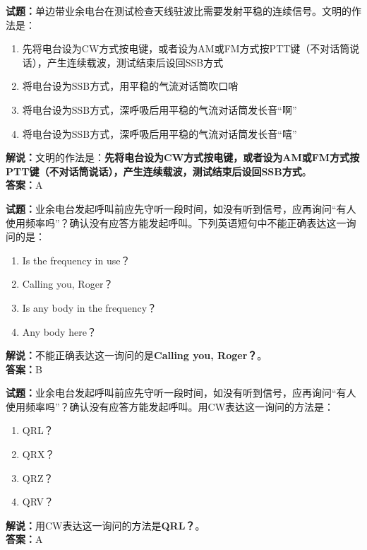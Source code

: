 \documentclass{ctexbook}
\begin{document}
\bigskip


\noindent\textbf{试题：}单边带业余电台在测试检查天线驻波比需要发射平稳的连续信号。文明的作法是：
\begin{enumerate}[leftmargin=3em]
\item 先将电台设为CW方式按电键，或者设为AM或FM方式按PTT键（不对话筒说话），产生连续载波，测试结束后设回SSB方式
\item 将电台设为SSB方式，用平稳的气流对话筒吹口哨
\item 将电台设为SSB方式，深呼吸后用平稳的气流对话筒发长音“啊”
\item 将电台设为SSB方式，深呼吸后用平稳的气流对话筒发长音“嘻”
\end{enumerate}
\noindent\textbf{解说：}文明的作法是：\textbf{先将电台设为CW方式按电键，或者设为AM或FM方式按PTT键（不对话筒说话），产生连续载波，测试结束后设回SSB方式}。\\\noindent\textbf{答案：}A



\bigskip


\noindent\textbf{试题：}业余电台发起呼叫前应先守听一段时间，如没有听到信号，应再询问“有人使用频率吗”？确认没有应答方能发起呼叫。下列英语短句中不能正确表达这一询问的是：
\begin{enumerate}[leftmargin=3em]
\item Is the frequency in use？
\item Calling you, Roger？%
\item Is any body in the frequency？
\item Any body here？
\end{enumerate}
\noindent\textbf{解说：}不能正确表达这一询问的是\textbf{Calling you, Roger？}。\\\noindent\textbf{答案：}B



\bigskip


\noindent\textbf{试题：}业余电台发起呼叫前应先守听一段时间，如没有听到信号，应再询问“有人使用频率吗”？确认没有应答方能发起呼叫。用CW表达这一询问的方法是：
\begin{enumerate}[leftmargin=3em]
\item QRL？
\item QRX？
\item QRZ？
\item QRV？
\end{enumerate}
\noindent\textbf{解说：}用CW表达这一询问的方法是\textbf{QRL？}。\\\noindent\textbf{答案：}A
\end{document}
